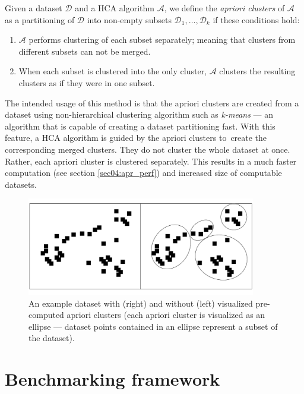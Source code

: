 \begin{defn}
	Given a dataset $\mathcal{D}$ and a HCA algorithm $\mathcal{A}$, we define the \emph{apriori clusters} of $\mathcal{A}$ as a partitioning of  $\mathcal{D}$ into non-empty subsets $\mathcal{D}_1,\dots,\mathcal{D}_k$    if these conditions hold:
	\begin{enumerate}
		\item $\mathcal{A}$ performs clustering of each subset separately; meaning that clusters from different subsets can not be merged.
		\item When each subset is clustered into the only cluster, $\mathcal{A}$ clusters the resulting clusters as if they were in one subset.
	\end{enumerate}
	\label{def03:apriori}
\end{defn}

The intended usage of this method is that the apriori clusters are created from a dataset using non-hierarchical clustering algorithm such as \emph{k-means} --- an algorithm that is capable of creating a dataset partitioning fast. With this feature, a HCA algorithm is guided by the apriori clusters to~create the corresponding merged clusters. They do not cluster the whole dataset at once. Rather, each apriori cluster is clustered separately. This results in a much faster computation (see section \ref{sec04:apr_perf}) and increased size of computable datasets. 

\begin{figure}\centering
	\includegraphics[width=10cm]{img/apriori_example}
	\caption{An example dataset with (right) and without (left) visualized pre-computed apriori clusters (each apriori cluster is visualized as an ellipse --- dataset points contained in an ellipse represent a subset of the dataset).}
	\label{fig03:apr_ex}
\end{figure}

\section{Benchmarking framework}

